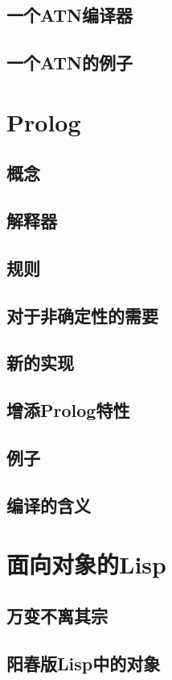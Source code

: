 \documentclass{ctexart}
\begin{document}
\subsection{一个ATN编译器}
\label{sec-23-4}
\subsection{一个ATN的例子}
\label{sec-23-5}
\section{Prolog}
\label{sec-24}
\subsection{概念}
\label{sec-24-1}
\subsection{解释器}
\label{sec-24-2}
\subsection{规则}
\label{sec-24-3}
\subsection{对于非确定性的需要}
\label{sec-24-4}
\subsection{新的实现}
\label{sec-24-5}
\subsection{增添Prolog特性}
\label{sec-24-6}
\subsection{例子}
\label{sec-24-7}
\subsection{编译的含义}
\label{sec-24-8}
\section{面向对象的Lisp}
\label{sec-25}
\subsection{万变不离其宗}
\label{sec-25-1}
\subsection{阳春版Lisp中的对象}
\label{sec-25-2}
\end{document}
